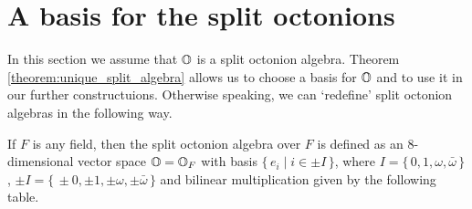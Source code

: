 \section{A basis for the split octonions}
\label{section:split_basis}

In this section we assume that $\mathbb{O}$ is a split octonion algebra. 
Theorem \ref{theorem:unique_split_algebra} 
allows us to choose a basis for $\mathbb{O}$ and to use it in our further constructuions.
Otherwise speaking, we can `redefine' split octonion algebras in the following way. 

\begin{definition}
	\label{def:split_octonions}
	If $F$ is any field, then the split octonion algebra over $F$ is defined as an
	$8$-dimensional vector space $\mathbb{O} = \mathbb{O}_F$ with basis $\{\,e_i \mid i \in \pm I\,\}$,
	where $I = \{\,0,1,\omega,\bar{\omega}\,\}$, $\pm I = \{\,\pm 0, \pm 1, \pm \omega,
	\pm \bar{\omega}\,\}$ and bilinear multiplication given by the following table.
\end{definition}

